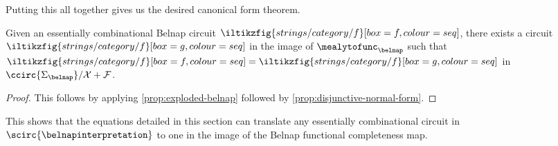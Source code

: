 Putting this all together gives us the desired canonical form theorem.

\begin{theorem}
    Given an essentially combinational Belnap circuit \(
    \iltikzfig{strings/category/f}[box=f,colour=seq]
    \), there exists a circuit \(
    \iltikzfig{strings/category/f}[box=g,colour=seq]
    \) in the image of \(\mealytofunc_\belnap\) such that \(
    \iltikzfig{strings/category/f}[box=f,colour=seq]
    =
    \iltikzfig{strings/category/f}[box=g,colour=seq]
    \) in \(\ccirc{\Sigma_\belnap} / \mathcal{X} + \mathcal{F}\).
\end{theorem}
\begin{proof}
    This follows by applying \cref{prop:exploded-belnap} followed by
    \cref{prop:disjunctive-normal-form}.
\end{proof}

This shows that the equations detailed in this section can translate any
essentially combinational circuit in \(\scirc{\belnapinterpretation}\) to one in
the image of the Belnap functional completeness map.